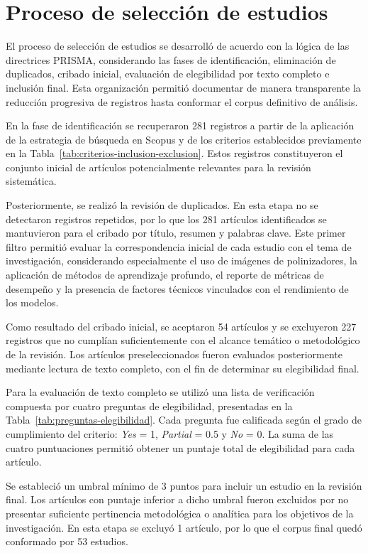 \vspace{-1.0 cm}

\section{Proceso de selección de estudios}

El proceso de selección de estudios se desarrolló de acuerdo con la lógica de las directrices PRISMA, considerando las fases de identificación, eliminación de duplicados, cribado inicial, evaluación de elegibilidad por texto completo e inclusión final. Esta organización permitió documentar de manera transparente la reducción progresiva de registros hasta conformar el corpus definitivo de análisis.

En la fase de identificación se recuperaron 281 registros a partir de la aplicación de la estrategia de búsqueda en Scopus y de los criterios establecidos previamente en la Tabla~\ref{tab:criterios-inclusion-exclusion}. Estos registros constituyeron el conjunto inicial de artículos potencialmente relevantes para la revisión sistemática.

Posteriormente, se realizó la revisión de duplicados. En esta etapa no se detectaron registros repetidos, por lo que los 281 artículos identificados se mantuvieron para el cribado por título, resumen y palabras clave. Este primer filtro permitió evaluar la correspondencia inicial de cada estudio con el tema de investigación, considerando especialmente el uso de imágenes de polinizadores, la aplicación de métodos de aprendizaje profundo, el reporte de métricas de desempeño y la presencia de factores técnicos vinculados con el rendimiento de los modelos.

Como resultado del cribado inicial, se aceptaron 54 artículos y se excluyeron 227 registros que no cumplían suficientemente con el alcance temático o metodológico de la revisión. Los artículos preseleccionados fueron evaluados posteriormente mediante lectura de texto completo, con el fin de determinar su elegibilidad final.

Para la evaluación de texto completo se utilizó una lista de verificación compuesta por cuatro preguntas de elegibilidad, presentadas en la Tabla~\ref{tab:preguntas-elegibilidad}. Cada pregunta fue calificada según el grado de cumplimiento del criterio: \textit{Yes} = 1, \textit{Partial} = 0.5 y \textit{No} = 0. La suma de las cuatro puntuaciones permitió obtener un puntaje total de elegibilidad para cada artículo.

Se estableció un umbral mínimo de 3 puntos para incluir un estudio en la revisión final. Los artículos con puntaje inferior a dicho umbral fueron excluidos por no presentar suficiente pertinencia metodológica o analítica para los objetivos de la investigación. En esta etapa se excluyó 1 artículo, por lo que el corpus final quedó conformado por 53 estudios.

